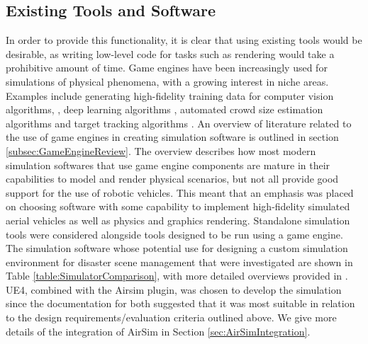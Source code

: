 \subsection{Existing Tools and Software}
In order to provide this functionality, it is clear that using existing tools would be desirable, as writing low-level code for tasks such as rendering would take a prohibitive amount of time. Game engines have been increasingly used for simulations of physical phenomena, with a growing interest in niche areas. Examples include generating high-fidelity training data for computer vision algorithms, \cite{Qiu2016UnrealCV:Engine}, deep learning algorithms \cite{Gaidon2016VirtualAnalysis}, automated crowd size estimation algorithms \cite{Lee2018DigitalCrowds} and target tracking algorithms \cite{Mueller2016ATracking}. An overview of literature related to the use of game engines in creating simulation software is outlined in section \ref{subsec:GameEngineReview}. The overview describes how most modern simulation softwares that use game engine components are mature in their capabilities to model and render physical scenarios, but not all provide good support for the use of robotic vehicles.
This meant that an emphasis was placed on choosing software with some capability to implement high-fidelity simulated aerial vehicles as well as physics and graphics rendering.
Standalone simulation tools were considered alongside tools designed to be run using a game engine. The simulation software whose potential use for designing a custom simulation environment for disaster scene management that were investigated are shown in Table \ref{table:SimulatorComparison}, with more detailed overviews provided in \cite{Ebeid2018ASimulators}. UE4, combined with the Airsim plugin, was chosen to develop the simulation since the documentation for both suggested that it was most suitable in relation to the design requirements/evaluation criteria outlined above. We give more details of the integration of AirSim in Section \ref{sec:AirSimIntegration}.\par
